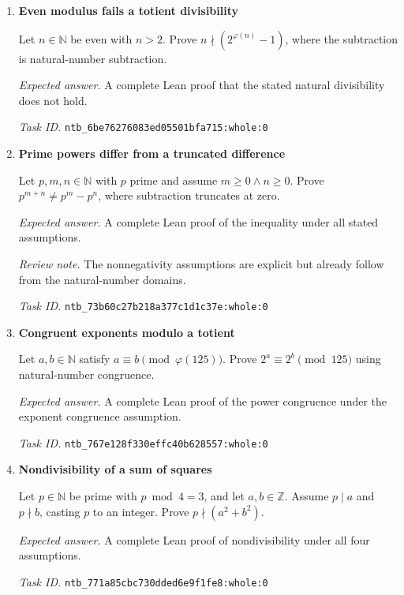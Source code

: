 \documentclass[11pt]{article}
\newcommand{\pth}[1]{\nolinkurl{#1}}
\begin{document}
\begin{enumerate}[label={TEST \arabic*.},leftmargin=4.5em,itemsep=1em]
\emph{Expected answer.} A complete Lean proof of the rational identity under the prime assumption.

\emph{Task ID.} \pth{ntb_5a32ab19491895603fc1af22:whole:0}

\item \textbf{Even modulus fails a totient divisibility}\label{qn:test:35}

Let $n\in\mathbb{N}$ be even with $n>2$. Prove $n\nmid(2^{\varphi(n)}-1)$, where the subtraction is natural-number subtraction.

\emph{Expected answer.} A complete Lean proof that the stated natural divisibility does not hold.

\emph{Task ID.} \pth{ntb_6be76276083ed05501bfa715:whole:0}

\item \textbf{Prime powers differ from a truncated difference}\label{qn:test:36}

Let $p,m,n\in\mathbb{N}$ with $p$ prime and assume $m\ge0\land n\ge0$. Prove $p^{m+n}\ne p^m-p^n$, where subtraction truncates at zero.

\emph{Expected answer.} A complete Lean proof of the inequality under all stated assumptions.

\emph{Review note.} The nonnegativity assumptions are explicit but already follow from the natural-number domains.

\emph{Task ID.} \pth{ntb_73b60c27b218a377c1d1c37e:whole:0}

\item \textbf{Congruent exponents modulo a totient}\label{qn:test:37}

Let $a,b\in\mathbb{N}$ satisfy $a\equiv b\pmod{\varphi(125)}$. Prove $2^a\equiv2^b\pmod{125}$ using natural-number congruence.

\emph{Expected answer.} A complete Lean proof of the power congruence under the exponent congruence assumption.

\emph{Task ID.} \pth{ntb_767e128f330effc40b628557:whole:0}

\item \textbf{Nondivisibility of a sum of squares}\label{qn:test:38}

Let $p\in\mathbb{N}$ be prime with $p\bmod4=3$, and let $a,b\in\mathbb{Z}$. Assume $p\mid a$ and $p\nmid b$, casting $p$ to an integer. Prove $p\nmid(a^2+b^2)$.

\emph{Expected answer.} A complete Lean proof of nondivisibility under all four assumptions.

\emph{Task ID.} \pth{ntb_771a85cbc730dded6e9f1fe8:whole:0}


\end{enumerate}
\end{document}
